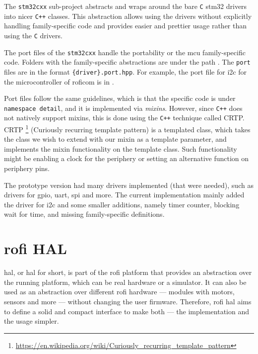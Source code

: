 \documentclass[
  digital,     %
  oneside,     %
  nosansbold,  %
  nocolorbold, %
  nolof,         %
  nolot,         %
]{fithesis4}
\newcommand{\TODO}[1]{#1} %
\newcommand{\TODOLIST}[1]{}
\begin{document}
The \lstinline|stm32cxx| sub-project abstracts and wraps around the bare \verb|C| stm32 drivers into
nicer \verb|C++| classes. This abstraction allows using the drivers without explicitly handling
family-specific code and provides easier and prettier usage rather than using the \verb|C| drivers.

The port files of the \lstinline|stm32cxx| handle the portability or the \acrshort{mcu}
family-specific code. Folders with the family-specific abstractions are under the path
. The \verb|port| files are in the format
\verb|{driver}.port.hpp|. For example, the port file for \acrshort{i2c} for the microcontroller of
\acrshort{roficom} is in .

Port files follow the same guidelines, which is that the specific code is under
\lstinline|namespace detail|, and it is implemented via \emph{mixins}.
However, since \verb|C++| does not natively
support mixins, this is done using the \verb|C++| technique called CRTP. CRTP
\footnote{\url{https://en.wikipedia.org/wiki/Curiously_recurring_template_pattern}} (Curiously
recurring template pattern) is a templated class, which takes the class we wish to extend with our
mixin as a template parameter, and implements the mixin functionality on the template class. Such
functionality might be enabling a clock for the periphery or setting an alternative function on
periphery pins.

The prototype version had many drivers implemented (that were needed), such as drivers for
\acrfull{gpio}, \acrshort{uart}, \acrshort{spi} and more. The current implementation mainly added
the driver for \acrshort{i2c} and some smaller additions, namely timer counter, blocking wait for
time, and missing family-specific definitions.

\section[ RoFI HAL ]{ \acrshort{rofi} HAL } \label{sec:rofi-hal-desc}
\TODOLIST{
\begin{itemize}
    \item ROFI HAL interface --- prototype vs changes
    \item ROFI HAL implementation esp32    
\end{itemize}
}

\acrlong{hal}, or \acrshort{hal} for short, is part of the \acrshort{rofi} platform that provides an
abstraction over the running platform, which can be real hardware or a simulator. It can also be
used as an abstraction over different \acrshort{rofi} hardware --- modules with motors, sensors and
more --- without changing the user firmware. Therefore, \acrshort{rofi} \acrshort{hal} aims to
define a solid and compact interface to make both --- the implementation and the usage simpler.
\end{document}
